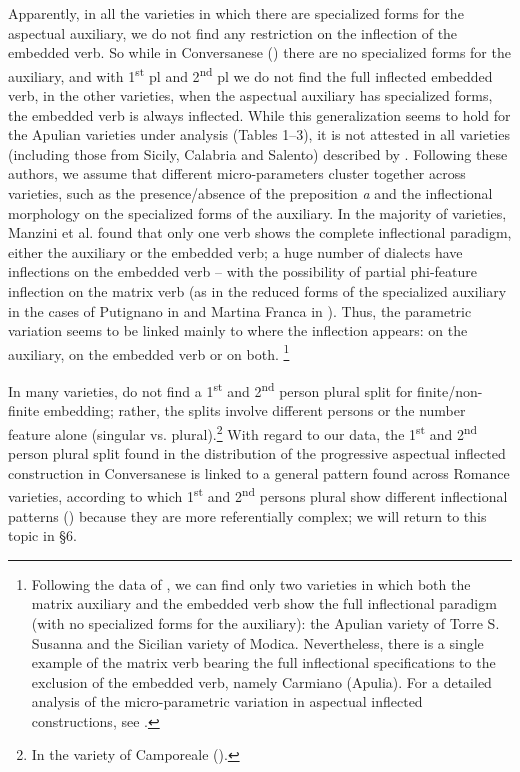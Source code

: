 \documentclass[output=paper]{langsci/langscibook}
\begin{document}
Apparently, in all the varieties in which there are specialized forms for the aspectual auxiliary, we do not find any restriction on the inflection of the embedded verb. So while in Conversanese () there are no specialized forms for the auxiliary, and with 1\textsuperscript{st} pl and 2\textsuperscript{nd} pl we do not find the full inflected embedded verb, in the other varieties, when the aspectual auxiliary has specialized forms, the embedded verb is always inflected. While this generalization seems to hold for the Apulian varieties under analysis (Tables 1–3), it is not attested in all varieties (including those from Sicily, Calabria and Salento) described by \citet{Manzini2017}. Following these authors, we assume that different micro{}-parameters cluster together across varieties, such as the presence\slash absence of the preposition \textit{a} and the inflectional morphology on the specialized forms of the auxiliary. In the majority of varieties, Manzini et al. found that only one verb shows the complete inflectional paradigm, either the auxiliary or the embedded verb; a huge number of dialects have inflections on the embedded verb – with the possibility of partial phi{}-feature inflection on the matrix verb (as in the reduced forms of the specialized auxiliary in the cases of Putignano in  and Martina Franca in ). Thus, the parametric variation seems to be linked mainly to where the inflection appears: on the auxiliary, on the embedded verb or on both. \footnote{Following the data of \citet{Manzini2017}, we can find only two varieties in which both the matrix auxiliary and the embedded verb show the full inflectional paradigm (with no specialized forms for the auxiliary): the Apulian variety of Torre S. Susanna and the Sicilian variety of Modica. Nevertheless, there is a single example of the matrix verb bearing the full inflectional specifications to the exclusion of the embedded verb, namely Carmiano (Apulia). For a detailed analysis of the micro-parametric variation in aspectual inflected constructions, see \citet{Manzini2017}.} 

In many varieties, \citet{Manzini2017} do not find a 1\textsuperscript{st} and 2\textsuperscript{nd} person plural split for finite\slash non-finite embedding; rather, the splits involve different persons or the number feature alone (singular vs. plural).\footnote{In the variety of Camporeale (\citealt[38]{Manzini2017}).} With regard to our data, the 1\textsuperscript{st} and 2\textsuperscript{nd} person plural split found in the distribution of the progressive aspectual inflected construction in Conversanese is linked to a general pattern found across Romance varieties, according to which 1\textsuperscript{st} and 2\textsuperscript{nd} persons plural show different inflectional patterns (\citealt{Manzini2005,Manzini2007,Manzini2011Bio}) because they are more referentially complex; we will return to this topic in §6. 
\end{document}
